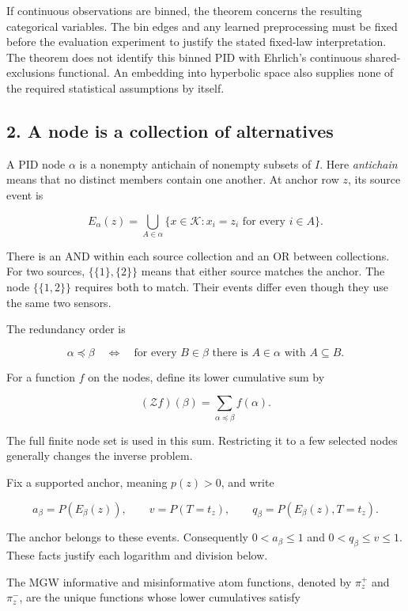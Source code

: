 If continuous observations are binned, the theorem concerns the resulting categorical variables. The bin edges and any learned preprocessing must be fixed before the evaluation experiment to justify the stated fixed-law interpretation. The theorem does not identify this binned PID with Ehrlich's continuous shared-exclusions functional. An embedding into hyperbolic space also supplies none of the required statistical assumptions by itself.

\subsection{2. A node is a collection of alternatives}\label{a-node-is-a-collection-of-alternatives}

A PID node \(\alpha\) is a nonempty antichain of nonempty subsets of \(I\). Here \emph{antichain} means that no distinct members contain one another. At anchor row \(z\), its source event is

\[
E_\alpha(z)=
\bigcup_{A\in\alpha}
\{x\in\mathcal K:x_i=z_i\text{ for every }i\in A\}.
\]

There is an AND within each source collection and an OR between collections. For two sources, \(\{\{1\},\{2\}\}\) means that either source matches the anchor. The node \(\{\{1,2\}\}\) requires both to match. Their events differ even though they use the same two sensors.

The redundancy order is

\[
\alpha\preceq\beta
\quad\Longleftrightarrow\quad
\text{for every }B\in\beta\text{ there is }A\in\alpha\text{ with }A\subseteq B.
\]

For a function \(f\) on the nodes, define its lower cumulative sum by

\[
(\mathcal Zf)(\beta)=\sum_{\alpha\preceq\beta}f(\alpha).
\]

The full finite node set is used in this sum. Restricting it to a few selected nodes generally changes the inverse problem.

Fix a supported anchor, meaning \(p(z)>0\), and write

\[
a_\beta=P(E_\beta(z)),\qquad
v=P(T=t_z),\qquad
q_\beta=P(E_\beta(z),T=t_z).
\]

The anchor belongs to these events. Consequently \(0<a_\beta\le1\) and \(0<q_\beta\le v\le1\). These facts justify each logarithm and division below.

The MGW informative and misinformative atom functions, denoted by \(\pi_z^+\) and \(\pi_z^-\), are the unique functions whose lower cumulatives satisfy

